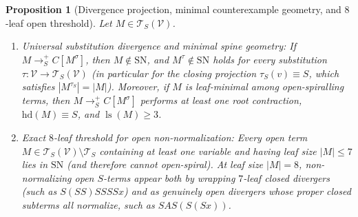 \documentclass[11pt,reqno]{amsart}
\numberwithin{equation}{section}
\theoremstyle{plain}
\newtheorem{proposition}[theorem]{Proposition}
\theoremstyle{definition}
\theoremstyle{remark}
\DeclareMathOperator{\ls}{ls}
\newcommand{\TS}{\mathcal{T}_S}
\newcommand{\TSV}{\mathcal{T}_S(\mathcal{V})}
\newcommand{\SN}{\mathrm{SN}}
\newcommand{\redSp}{\to_S^+}
\begin{document}
\begin{proposition}[Divergence projection, minimal counterexample geometry, and $8$-leaf open threshold]\label{prop:open-spiral-divergence-threshold}
Let $M \in \TSV$.
\begin{enumerate}[label=(\roman*),leftmargin=2.2em]
  \item \emph{Universal substitution divergence and minimal spine geometry:} If $M \redSp C[M^\sigma]$, then $M \notin \SN$, and $M^\tau \notin \SN$ holds for every substitution $\tau \colon \mathcal{V} \to \TSV$ (in particular for the closing projection $\tau_S(v) \equiv S$, which satisfies $|M^{\tau_S}| = |M|$). Moreover, if $M$ is leaf-minimal among open-spiralling terms, then $M \redSp C[M^\sigma]$ performs at least one root contraction, $\mathrm{hd}(M) \equiv S$, and $\ls(M) \ge 3$.
  \item \emph{Exact $8$-leaf threshold for open non-normalization:} Every open term $M \in \TSV \setminus \TS$ containing at least one variable and having leaf size $|M| \le 7$ lies in $\SN$ (and therefore cannot open-spiral). At leaf size $|M| = 8$, non-normalizing open $S$-terms appear both by wrapping $7$-leaf closed divergers (such as $S(S S)S S S S x$) and as genuinely open divergers whose proper closed subterms all normalize, such as $S A S (S(S x))$.
\end{enumerate}
\end{proposition}
\end{document}
